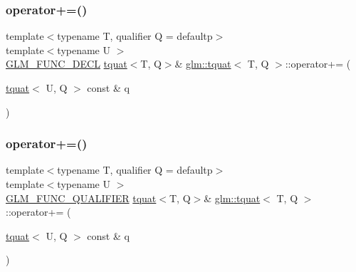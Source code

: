 \subsubsection{\texorpdfstring{operator+=()}{operator+=()}\hspace{0.1cm}{\footnotesize\ttfamily [1/2]}}
{\footnotesize\ttfamily template$<$typename T, qualifier Q = defaultp$>$ \\
template$<$typename U $>$ \\
\mbox{\hyperlink{setup_8hpp_ab2d052de21a70539923e9bcbf6e83a51}{G\+L\+M\+\_\+\+F\+U\+N\+C\+\_\+\+D\+E\+CL}} \mbox{\hyperlink{structglm_1_1tquat}{tquat}}$<$T, Q$>$\& \mbox{\hyperlink{structglm_1_1tquat}{glm\+::tquat}}$<$ T, Q $>$\+::operator+= (\begin{DoxyParamCaption}\item[{\mbox{\hyperlink{structglm_1_1tquat}{tquat}}$<$ U, Q $>$ const \&}]{q }\end{DoxyParamCaption})}

\mbox{\label{structglm_1_1tquat_afe4fd15b1ec1080a813466f1ab3509c5}} 
\subsubsection{\texorpdfstring{operator+=()}{operator+=()}\hspace{0.1cm}{\footnotesize\ttfamily [2/2]}}
{\footnotesize\ttfamily template$<$typename T, qualifier Q = defaultp$>$ \\
template$<$typename U $>$ \\
\mbox{\hyperlink{setup_8hpp_a33fdea6f91c5f834105f7415e2a64407}{G\+L\+M\+\_\+\+F\+U\+N\+C\+\_\+\+Q\+U\+A\+L\+I\+F\+I\+ER}} \mbox{\hyperlink{structglm_1_1tquat}{tquat}}$<$T, Q$>$\& \mbox{\hyperlink{structglm_1_1tquat}{glm\+::tquat}}$<$ T, Q $>$\+::operator+= (\begin{DoxyParamCaption}\item[{\mbox{\hyperlink{structglm_1_1tquat}{tquat}}$<$ U, Q $>$ const \&}]{q }\end{DoxyParamCaption})}

\mbox{\label{structglm_1_1tquat_a1f48d26214f6efcb8f1c6a222e45fae1}} 
